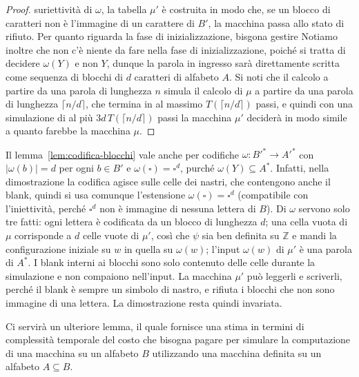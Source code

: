 \begin{lemm}
\begin{proof}
suriettività di
$\omega$, la tabella 
$\mu'$ è costruita in modo che, 
se un blocco di caratteri non è
l'immagine di un carattere di 
$B'$, la macchina passa allo stato di rifiuto. 
Per quanto riguarda la fase di inizializzazione, bisgona gestire
Notiamo inoltre
che non c'è niente da fare nella fase di inizializzazione, poiché si tratta di decidere
$\omega(Y)$ e non $Y$, dunque la parola in ingresso sarà direttamente scritta come sequenza
di blocchi di $d$ caratteri di alfabeto $A$. Si noti che il calcolo a partire da una parola
di lunghezza $n$ simula il calcolo di $\mu$ a partire da una parola di lunghezza
$\lceil n/d \rceil$,
che termina in al massimo $T(\lceil n/d \rceil)$ passi, e quindi con
una simulazione di al più $3d\,T(\lceil n/d \rceil)$ passi la macchina $\mu'$ deciderà in
modo simile a quanto farebbe la macchina $\mu$.
\end{proof}
\end{lemm}
\begin{rema}\label{rem:codifica-blocchi}
Il lemma~\ref{lem:codifica-blocchi} vale anche per codifiche
$\omega\colon B'^*\to A'^*$ con $|\omega(b)|=d$ per ogni $b\in B'$ e
$\omega(\square)=\square^d$, purché $\omega(Y)\subseteq A^*$.
Infatti, nella dimostrazione la codifica agisce sulle celle dei nastri, che
contengono anche il blank, quindi si usa comunque l'estensione
$\omega(\square)=\square^d$ (compatibile con l'iniettività, perché $\square^d$ non
è immagine di nessuna lettera di $B$). Di $\omega$ servono solo tre fatti:
ogni lettera è codificata da un blocco di lunghezza $d$; una cella vuota di $\mu$
corrisponde a $d$ celle vuote di $\mu'$, così che $\psi$ sia ben definita su
$\mathbb Z$ e mandi la configurazione iniziale su $w$ in quella su $\omega(w)$;
l'input $\omega(w)$ di $\mu'$ è una parola di $A^*$. I blank interni ai blocchi
sono solo contenuto delle celle durante la simulazione e non compaiono
nell'input. La macchina $\mu'$ può leggerli e scriverli, perché il blank è
sempre un simbolo di nastro, e rifiuta i blocchi che non sono immagine di una
lettera. La dimostrazione resta quindi invariata.
\end{rema}
Ci servirà un ulteriore lemma, il quale fornisce una stima
in termini di complessità temporale del costo che bisogna pagare per simulare la
computazione di una macchina su un alfabeto $B$ utilizzando una macchina definita su un
alfabeto $A \subseteq B$.


